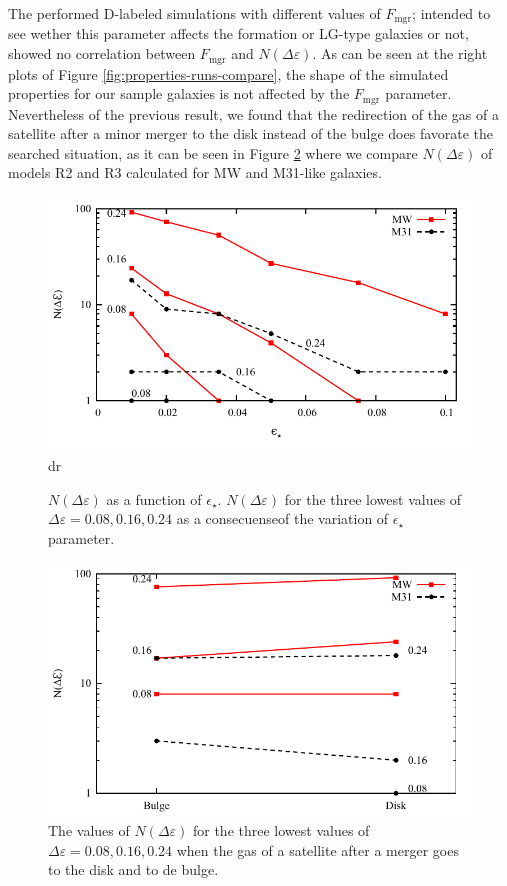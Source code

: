\documentclass[usenatbib]{mn2e}
\begin{document}
The performed D-labeled simulations with different values of  $F_{\text{mgr}}$; intended to see wether this parameter affects the formation or LG-type galaxies or not,
showed no correlation between $F_{\text{mgr}}$ and $N(\Delta\varepsilon)$. As can be seen at the right plots of Figure \ref{fig:properties-runs-compare}, the shape of the
 simulated properties for our sample galaxies is not affected by the $F_{\text{mgr}}$ parameter. Nevertheless of the previous result, we found that the 
redirection of the gas of a satellite after  a minor merger to the disk instead of the bulge does favorate the searched situation, as it can be seen in Figure
 \ref{fig:lg-chi-gas-moves-to} where we compare $N(\Delta\varepsilon)$ of models R2 and R3 calculated for MW and M31-like galaxies.

\begin{figure}
\centering
 \includegraphics[scale=0.68]{figures/chi-parameters/chi-squared-star-form-eff-v2.pdf}dr
\caption{$N(\Delta\varepsilon)$ as a function of $\epsilon_{\star}$. $N(\Delta\varepsilon)$ for the three lowest values of $\Delta\varepsilon=0.08,0.16,0.24$ 
as a consecuenseof the variation of $\epsilon_{\star}$ parameter. \label{fig:lg-chi-disk-star-eff}}
\end{figure}


\begin{figure}
\centering
 \includegraphics[scale=0.68]{figures/chi-parameters/chi-squared-merger-ratio-v2.pdf}
\caption{The values of $N(\Delta\varepsilon)$  for the three lowest values of $\Delta\varepsilon=0.08,0.16,0.24$ when the gas of a satellite after a merger goes to the 
disk and to de bulge. \label{fig:lg-chi-gas-moves-to}}
\end{figure}
\end{document}
